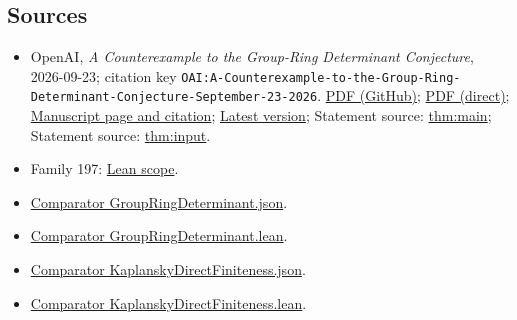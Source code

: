 \documentclass[11pt]{article}
\begin{document}
\subsection{Sources}
\begin{itemize}
\item OpenAI, \emph{A Counterexample to the Group-Ring Determinant Conjecture}, 2026-09-23; citation key \texttt{OAI:A-Counterexample-to-the-Group-Ring-Determinant-Conjecture-September-23-2026}. \href{https://github.com/openai/math/blob/adc7f1241b42e322a6451854ab7e4b4c146bf78a/preprints/A-Counterexample-to-the-Group-Ring-Determinant-Conjecture-September-23-2026/paper.pdf}{PDF (GitHub)}; \href{https://github.com/openai/math/raw/adc7f1241b42e322a6451854ab7e4b4c146bf78a/preprints/A-Counterexample-to-the-Group-Ring-Determinant-Conjecture-September-23-2026/paper.pdf}{PDF (direct)}; \href{https://github.com/openai/math/blob/adc7f1241b42e322a6451854ab7e4b4c146bf78a/preprints/A-Counterexample-to-the-Group-Ring-Determinant-Conjecture-September-23-2026/README.md}{Manuscript page and citation}; \href{https://github.com/openai/math/blob/main/preprints/A-Counterexample-to-the-Group-Ring-Determinant-Conjecture-September-23-2026/paper.pdf}{Latest version}; Statement source: \href{https://github.com/openai/math/blob/adc7f1241b42e322a6451854ab7e4b4c146bf78a/preprints/A-Counterexample-to-the-Group-Ring-Determinant-Conjecture-September-23-2026/build/main.tex\#L90}{thm:main}; Statement source: \href{https://github.com/openai/math/blob/adc7f1241b42e322a6451854ab7e4b4c146bf78a/preprints/A-Counterexample-to-the-Group-Ring-Determinant-Conjecture-September-23-2026/build/main.tex\#L107}{thm:input}.
\item Family 197: \href{https://github.com/openai/math/blob/adc7f1241b42e322a6451854ab7e4b4c146bf78a/lean/docs/197.md}{Lean scope}.
\item \href{https://github.com/openai/math/blob/adc7f1241b42e322a6451854ab7e4b4c146bf78a/lean/ComparatorChallenges/GroupRingDeterminant.json}{Comparator GroupRingDeterminant.json}.
\item \href{https://github.com/openai/math/blob/adc7f1241b42e322a6451854ab7e4b4c146bf78a/lean/ComparatorChallenges/GroupRingDeterminant.lean}{Comparator GroupRingDeterminant.lean}.
\item \href{https://github.com/openai/math/blob/adc7f1241b42e322a6451854ab7e4b4c146bf78a/lean/ComparatorChallenges/KaplanskyDirectFiniteness.json}{Comparator KaplanskyDirectFiniteness.json}.
\item \href{https://github.com/openai/math/blob/adc7f1241b42e322a6451854ab7e4b4c146bf78a/lean/ComparatorChallenges/KaplanskyDirectFiniteness.lean}{Comparator KaplanskyDirectFiniteness.lean}.

\end{itemize}
\end{document}
